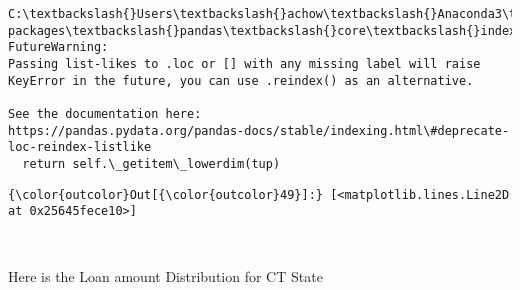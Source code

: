 \documentclass[11pt]{article}
\begin{document}
    \begin{Verbatim}[commandchars=\\\{\}]
C:\textbackslash{}Users\textbackslash{}achow\textbackslash{}Anaconda3\textbackslash{}lib\textbackslash{}site-packages\textbackslash{}pandas\textbackslash{}core\textbackslash{}indexing.py:870: FutureWarning: 
Passing list-likes to .loc or [] with any missing label will raise
KeyError in the future, you can use .reindex() as an alternative.

See the documentation here:
https://pandas.pydata.org/pandas-docs/stable/indexing.html\#deprecate-loc-reindex-listlike
  return self.\_getitem\_lowerdim(tup)

    \end{Verbatim}

\begin{Verbatim}[commandchars=\\\{\}]
{\color{outcolor}Out[{\color{outcolor}49}]:} [<matplotlib.lines.Line2D at 0x25645fece10>]
\end{Verbatim}
            
    \begin{center}
    \end{center}
    { \hspace*{\fill} \\}
    
    Here is the Loan amount Distribution for CT State
\end{document}
